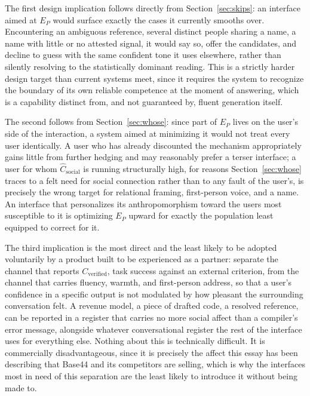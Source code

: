 \documentclass[11pt]{article}
\begin{document}
The first design implication follows directly from Section~\ref{sec:skips}: an interface aimed at $E_P$ would surface exactly the cases it currently smooths over. Encountering an ambiguous reference, several distinct people sharing a name, a name with little or no attested signal, it would say so, offer the candidates, and decline to guess with the same confident tone it uses elsewhere, rather than silently resolving to the statistically dominant reading. This is a strictly harder design target than current systems meet, since it requires the system to recognize the boundary of its own reliable competence at the moment of answering, which is a capability distinct from, and not guaranteed by, fluent generation itself.

The second follows from Section~\ref{sec:whose}: since part of $E_P$ lives on the user's side of the interaction, a system aimed at minimizing it would not treat every user identically. A user who has already discounted the mechanism appropriately gains little from further hedging and may reasonably prefer a terser interface; a user for whom $\widehat{C}_{\mathrm{social}}$ is running structurally high, for reasons Section~\ref{sec:whose} traces to a felt need for social connection rather than to any fault of the user's, is precisely the wrong target for relational framing, first-person voice, and a name. An interface that personalizes its anthropomorphism toward the users most susceptible to it is optimizing $E_P$ upward for exactly the population least equipped to correct for it.

The third implication is the most direct and the least likely to be adopted voluntarily by a product built to be experienced as a partner: separate the channel that reports $C_{\mathrm{verified}}$, task success against an external criterion, from the channel that carries fluency, warmth, and first-person address, so that a user's confidence in a specific output is not modulated by how pleasant the surrounding conversation felt. A revenue model, a piece of drafted code, a resolved reference, can be reported in a register that carries no more social affect than a compiler's error message, alongside whatever conversational register the rest of the interface uses for everything else. Nothing about this is technically difficult. It is commercially disadvantageous, since it is precisely the affect this essay has been describing that Base44 and its competitors are selling, which is why the interfaces most in need of this separation are the least likely to introduce it without being made to.
\end{document}
